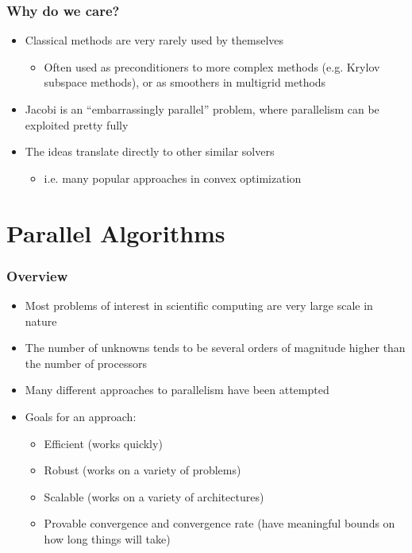 \documentclass{beamer}
\begin{document}
\begin{frame}
	\frametitle{Why do we care?}
	\begin{itemize}
		\item Classical methods are very rarely used by themselves
			\begin{itemize}
				\item Often used as preconditioners to more complex methods (e.g. Krylov subspace methods), or as smoothers in multigrid methods
			\end{itemize}
		\item Jacobi is an ``embarrassingly parallel'' problem, where parallelism can be exploited pretty fully
		\item The ideas translate directly to other similar solvers 
			\begin{itemize}
				\item i.e. many popular approaches in convex optimization
			\end{itemize}
	\end{itemize}	
\end{frame}


\section{Parallel Algorithms}

\begin{frame}
	\frametitle{Overview}
	\begin{itemize}
		\item Most problems of interest in scientific computing are very large scale in nature
		\item The number of unknowns tends to be several orders of magnitude higher than the number of processors
		\item Many different approaches to parallelism have been attempted
		\item Goals for an approach:
			\begin{itemize}
				\item Efficient (works quickly)
				\item Robust (works on a variety of problems)
				\item Scalable (works on a variety of architectures)
				\item Provable convergence and convergence rate (have meaningful bounds on how long things will take)
			\end{itemize}
	\end{itemize}	
\end{frame}
\end{document}
